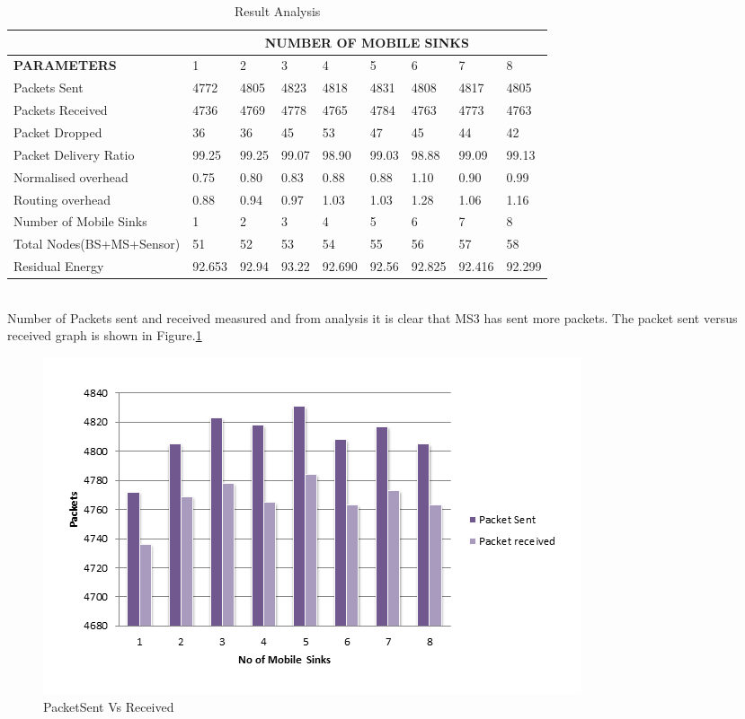\documentclass[MTech]{iitmdiss}
\begin{document}
\begin{table}[!ht]
\small
\renewcommand\arraystretch{2.4} \setlength\minrowclearance{2.4pt}
\centering
\caption{\label{table4} Result Analysis}
\hfill{}
\begin{tabular}{ |p{3.5cm}||p{1cm}|p{1cm}|p{1cm}|p{1cm}|p{1cm}|p{1cm}|p{1cm}|p{1cm}|}
 \hline
& \multicolumn{8}{|c|}{\textbf{NUMBER OF MOBILE SINKS}} \\
 \hline
\textbf{PARAMETERS} &1&2&3&4&5&6&7&8\\
 \hline
 Packets Sent   & 4772 &4805&4823&4818&4831&4808&4817&4805\\
 \hline
 Packets Received& 4736 &4769&4778&4765&4784&4763&4773&4763\\
 \hline
 Packet Dropped &36 &36&45&53&47&45&44&42\\
 \hline
 Packet Delivery Ratio  &99.25 &99.25&99.07&98.90&99.03&98.88&99.09&99.13\\
 \hline
 Normalised overhead& 0.75& 0.80&0.83&0.88&0.88&1.10&0.90&0.99\\
 \hline
 Routing overhead&  0.88& 0.94&0.97&1.03&1.03&1.28&1.06&1.16\\
 \hline
 Number of Mobile Sinks&1&2&3&4&5&6&7&8\\
 \hline
 Total Nodes(BS+MS+Sensor)&51&52&53&54&55&56&57&58\\
 \hline
  Residual Energy&92.653&92.94&93.22&92.690&92.56&92.825&92.416&92.299\\
 \hline
\end{tabular}\hfill{}
\end{table}\\
Number of Packets sent and received measured and from analysis it is clear that MS3 has sent more packets. The packet sent versus received graph is shown in Figure.\ref{p1}


\begin{figure}
\center
\includegraphics[scale=0.80]{PacketSentVsReceived.PNG}
\caption{PacketSent Vs Received}
\label{p1}
\end{figure}\\
\end{document}
